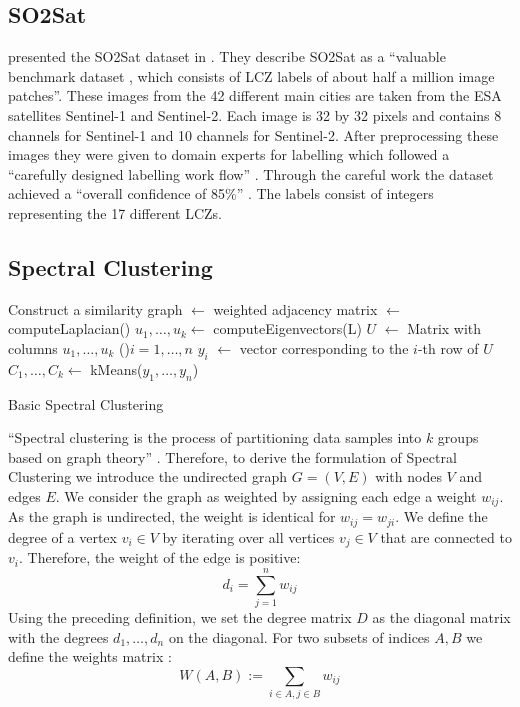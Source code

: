\subsection{SO2Sat}
\label{subsec:so2sat}
\citeauthor{zhu_so2sat_2019} presented the SO2Sat dataset in \cite{zhu_so2sat_2019}.
They describe SO2Sat as a \enquote{valuable benchmark dataset \textelp{}, which consists of \gls{LCZ} labels of about half a million \textelp{} image patches}.
These images from the 42 different main cities are taken from the \gls{ESA} satellites Sentinel-1 and Sentinel-2. Each image is 32 by 32 pixels and contains 8 channels for Sentinel-1 and 10 channels for Sentinel-2.
After preprocessing these images they were given to domain experts for labelling which followed a \enquote{carefully designed labelling work flow} \cite{zhu_so2sat_2019}.
Through the careful work the dataset achieved a \enquote{overall confidence of 85\%} \cite{zhu_so2sat_2019}.
The labels consist of integers representing the 17 different \glspl{LCZ}.

\subsection{Spectral Clustering}
\label{subsec:spectral_clustering}

\begin{algorithm}[b]
  Construct a similarity graph\;
  \Adj \(\leftarrow\) weighted adjacency matrix\;
  \Laplace \(\leftarrow\) computeLaplacian(\Adj)\;
  \(u_1, \ldots, u_k \leftarrow\) computeEigenvectors(L)\;
  \(U\) \(\leftarrow\) Matrix with columns \(u_1, \ldots, u_k\)\;
  \ForEach(){\(i = 1, \ldots, n\)}{
    \(y_i\) \(\leftarrow\) vector corresponding to the \(i\)-th row of \(U\)
  }
\(C_1, \ldots, C_k \leftarrow\) kMeans(\(y_1, \ldots, y_n\))\;

  \caption{Basic Spectral Clustering}\label{alg:basic_spectral}
 \end{algorithm}

\enquote{Spectral clustering is the process of partitioning data samples into
\(k\) groups based on graph theory} \cite{krajsek_helmholtz_nodate}. Therefore,
to derive the formulation of Spectral Clustering we introduce the undirected graph \(G=(V, E)\) with nodes \(V\) and edges \(E\).
We consider the graph as weighted by assigning each edge a weight \(w_{ij}\). As the graph
is undirected, the weight is identical for \(w_{ij} = w_{ji} \).
We define the degree of a vertex \(v_i \in V\) by iterating over all vertices \(v_j \in V\) that are connected to \(v_i\).
Therefore, the weight of the edge is positive:
\[d_i = \sum_{j=1}^n w_{ij}\]
Using the preceding definition, we set the degree matrix \(D\) as the diagonal matrix with the degrees \(d_1, \ldots, d_n\) on the diagonal.
\cite{von_luxburg_tutorial_2007}
For two subsets of indices \(A, B\) we define the weights matrix \cite{von_luxburg_tutorial_2007}:
\[W(A, B) := \sum_{i \in A, j \in B} w_{ij}\]


